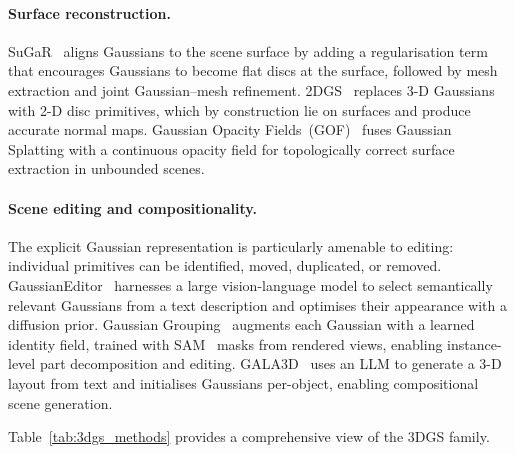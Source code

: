 \paragraph{Surface reconstruction.}
SuGaR~\citep{guedon2024sugar} aligns Gaussians to the scene surface by adding
a regularisation term that encourages Gaussians to become flat discs at
the surface, followed by mesh extraction and joint Gaussian--mesh refinement.
2DGS~\citep{huang2024_2dgs} replaces 3-D Gaussians with 2-D disc primitives,
which by construction lie on surfaces and produce accurate normal maps.
Gaussian Opacity Fields~(GOF)~\citep{yu2024gof} fuses Gaussian Splatting with
a continuous opacity field for topologically correct surface extraction in
unbounded scenes.

\paragraph{Scene editing and compositionality.}
The explicit Gaussian representation is particularly amenable to editing:
individual primitives can be identified, moved, duplicated, or removed.
GaussianEditor~\citep{chen2024gaussianeditor} harnesses a large vision-language
model to select semantically relevant Gaussians from a text description and
optimises their appearance with a diffusion prior.
Gaussian Grouping~\citep{ye2023gaussian_grouping} augments each Gaussian with
a learned identity field, trained with SAM~\citep{kirillov2023sam} masks from
rendered views, enabling instance-level part decomposition and editing.
GALA3D~\citep{zhou2024gala3d} uses an LLM to generate a 3-D layout from text
and initialises Gaussians per-object, enabling compositional scene generation.

Table~\ref{tab:3dgs_methods} provides a comprehensive view of the 3DGS family.

